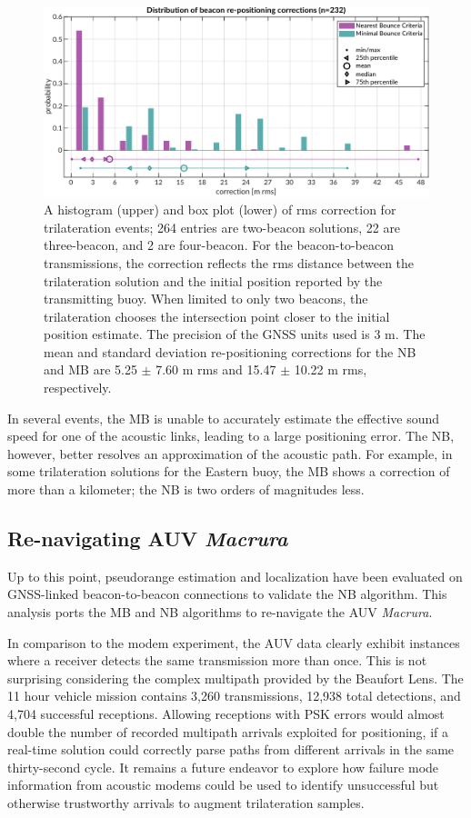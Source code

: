 \documentclass[preprint,TurnOnLineNumbers]{JASA}
\begin{document}
\begin{figure}[!ht]
\includegraphics[width=\textwidth]{Fig11.pdf}
\caption{A histogram (upper) and box plot (lower) of rms correction for trilateration events; 264 entries are two-beacon solutions, 22 are three-beacon, and 2 are four-beacon. For the beacon-to-beacon transmissions, the correction reflects the rms distance between the trilateration solution and the initial position reported by the transmitting buoy. When limited to only two beacons, the trilateration chooses the intersection point closer to the initial position estimate. The precision of the GNSS units used is 3 m. The mean and standard deviation re-positioning corrections for the NB and MB are 5.25 $\pm$ 7.60 m rms and 15.47 $\pm$ 10.22 m rms, respectively.}
\label{fig:trilat-beacon}
\end{figure}

In several events, the MB is unable to accurately estimate the effective sound speed for one of the acoustic links, leading to a large positioning error.
The NB, however, better resolves an approximation of the acoustic path.
For example, in some trilateration solutions for the Eastern buoy, the MB shows a correction of more than a kilometer; the NB is two orders of magnitudes less.

\subsection{Re-navigating AUV \emph{Macrura}}

Up to this point, pseudorange estimation and localization have been evaluated on GNSS-linked beacon-to-beacon connections to validate the NB algorithm.
This analysis ports the MB and NB algorithms to re-navigate the AUV \emph{Macrura}.

In comparison to the modem experiment, the AUV data clearly exhibit instances where a receiver detects the same transmission more than once.
This is not surprising considering the complex multipath provided by the Beaufort Lens.
The 11 hour vehicle mission contains 3,260 transmissions, 12,938 total detections, and 4,704 successful receptions.
Allowing receptions with PSK errors would almost double the number of recorded multipath arrivals exploited for positioning, if a real-time solution could correctly parse paths from different arrivals in the same thirty-second cycle.
It remains a future endeavor to explore how failure mode information from acoustic modems could be used to identify unsuccessful but otherwise trustworthy arrivals to augment trilateration samples.
\end{document}
